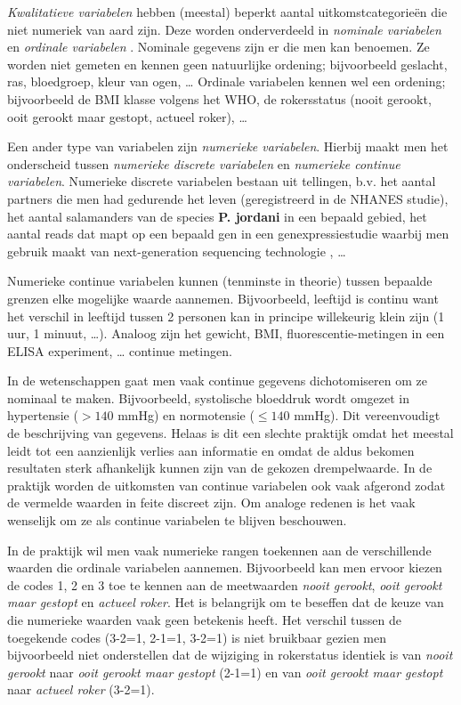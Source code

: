 \documentclass[12pt,dutch,coursenotes]{book}
\theoremstyle{definition}
\theoremstyle{definition}
\theoremstyle{definition}
\theoremstyle{remark}
\begin{document}
\emph{Kwalitatieve variabelen} hebben (meestal) beperkt aantal
uitkomstcategorieën die niet numeriek van aard zijn. Deze worden
onderverdeeld in \emph{nominale variabelen} en \emph{ordinale
variabelen} . Nominale gegevens zijn er die men kan benoemen. Ze worden
niet gemeten en kennen geen natuurlijke ordening; bijvoorbeeld geslacht,
ras, bloedgroep, kleur van ogen, \ldots{} Ordinale variabelen kennen wel
een ordening; bijvoorbeeld de BMI klasse volgens het WHO, de
rokersstatus (nooit gerookt, ooit gerookt maar gestopt, actueel roker),
\ldots{}

Een ander type van variabelen zijn \emph{numerieke variabelen}. Hierbij
maakt men het onderscheid tussen \emph{numerieke discrete variabelen} en
\emph{numerieke continue variabelen}. Numerieke discrete variabelen
bestaan uit tellingen, b.v. het aantal partners die men had gedurende
het leven (geregistreerd in de NHANES studie), het aantal salamanders
van de species \textbf{P. jordani} in een bepaald gebied, het aantal
reads dat mapt op een bepaald gen in een genexpressiestudie waarbij men
gebruik maakt van next-generation sequencing technologie , \ldots{}

Numerieke continue variabelen kunnen (tenminste in theorie) tussen
bepaalde grenzen elke mogelijke waarde aannemen. Bijvoorbeeld, leeftijd
is continu want het verschil in leeftijd tussen 2 personen kan in
principe willekeurig klein zijn (1 uur, 1 minuut, \ldots{}). Analoog
zijn het gewicht, BMI, fluorescentie-metingen in een ELISA experiment,
\ldots{} continue metingen.

In de wetenschappen gaat men vaak continue gegevens dichotomiseren om ze
nominaal te maken. Bijvoorbeeld, systolische bloeddruk wordt omgezet in
hypertensie (\(>140\) mmHg) en normotensie (\(\leq 140\) mmHg). Dit
vereenvoudigt de beschrijving van gegevens. Helaas is dit een slechte
praktijk omdat het meestal leidt tot een aanzienlijk verlies aan
informatie en omdat de aldus bekomen resultaten sterk afhankelijk kunnen
zijn van de gekozen drempelwaarde. In de praktijk worden de uitkomsten
van continue variabelen ook vaak afgerond zodat de vermelde waarden in
feite discreet zijn. Om analoge redenen is het vaak wenselijk om ze als
continue variabelen te blijven beschouwen.

In de praktijk wil men vaak numerieke rangen toekennen aan de
verschillende waarden die ordinale variabelen aannemen. Bijvoorbeeld kan
men ervoor kiezen de codes 1, 2 en 3 toe te kennen aan de meetwaarden
\emph{nooit gerookt}, \emph{ooit gerookt maar gestopt} en \emph{actueel
roker}. Het is belangrijk om te beseffen dat de keuze van die numerieke
waarden vaak geen betekenis heeft. Het verschil tussen de toegekende
codes (3-2=1, 2-1=1, 3-2=1) is niet bruikbaar gezien men bijvoorbeeld
niet onderstellen dat de wijziging in rokerstatus identiek is van
\emph{nooit gerookt} naar \emph{ooit gerookt maar gestopt} (2-1=1) en
van \emph{ooit gerookt maar gestopt} naar \emph{actueel roker} (3-2=1).
\end{document}
